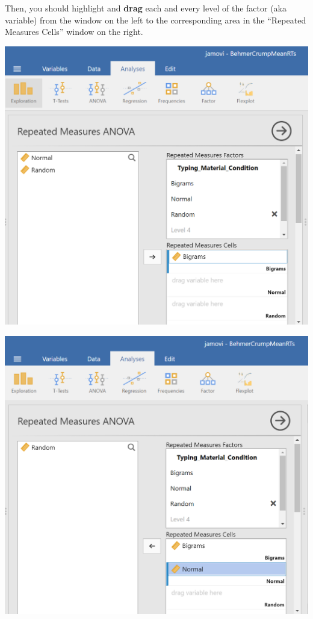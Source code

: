 \documentclass[
]{book}
\begin{document}
Then, you should highlight and \textbf{drag} each and every level of the factor (aka variable) from the window on the left to the corresponding area in the ``Repeated Measures Cells'' window on the right.

\includegraphics{img/RM_ANOVA_BigramsMoved.png}

\includegraphics{img/RM_ANOVA_NormalMoved.png}
\end{document}

